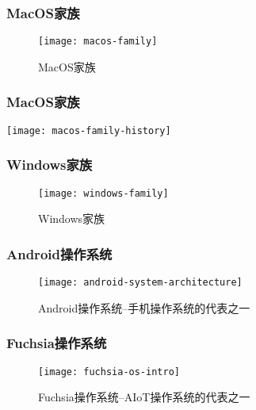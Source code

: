 \begin{frame}[plain]
	
	\frametitle{MacOS家族}
	
	\begin{figure}
		\centering
		\texttt{[image: macos-family]}
		\caption{MacOS家族}
	\end{figure}
	
\end{frame}
\begin{frame}[plain]
	
	\frametitle{MacOS家族}
	
		\texttt{[image: macos-family-history]}
	
\end{frame}

\begin{frame}
	
	\frametitle{Windows家族}
	
	\begin{figure}
		\centering
		\texttt{[image: windows-family]}
		\caption{Windows家族}
	\end{figure}
	
\end{frame}

\begin{frame}[plain]
	\frametitle{Android操作系统}
	
	\begin{figure}
		\centering
		\texttt{[image: android-system-architecture]}
		\caption{Android操作系统--手机操作系统的代表之一}
	\end{figure}
	
\end{frame}


\begin{frame}[plain]
	\frametitle{Fuchsia操作系统}
	
	\begin{figure}
		\centering
		\texttt{[image: fuchsia-os-intro]}
		\caption{Fuchsia操作系统--AIoT操作系统的代表之一}
	\end{figure}
	
\end{frame}


